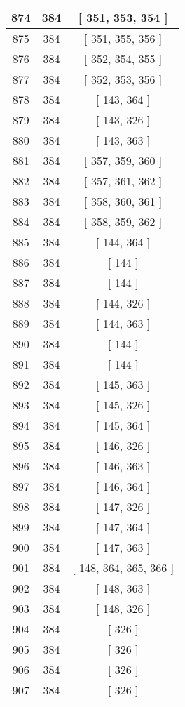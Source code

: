 \begin{center}
\begin{longtable}[H]{|| c c c ||}
\hline
874 & 384 & [ 351, 353, 354 ] \\ 
\hline
875 & 384 & [ 351, 355, 356 ] \\ 
\hline
876 & 384 & [ 352, 354, 355 ] \\ 
\hline
877 & 384 & [ 352, 353, 356 ] \\ 
\hline
878 & 384 & [ 143, 364 ] \\ 
\hline
879 & 384 & [ 143, 326 ] \\ 
\hline
880 & 384 & [ 143, 363 ] \\ 
\hline
881 & 384 & [ 357, 359, 360 ] \\ 
\hline
882 & 384 & [ 357, 361, 362 ] \\ 
\hline
883 & 384 & [ 358, 360, 361 ] \\ 
\hline
884 & 384 & [ 358, 359, 362 ] \\ 
\hline
885 & 384 & [ 144, 364 ] \\ 
\hline
886 & 384 & [ 144 ] \\ 
\hline
887 & 384 & [ 144 ] \\ 
\hline
888 & 384 & [ 144, 326 ] \\ 
\hline
889 & 384 & [ 144, 363 ] \\ 
\hline
890 & 384 & [ 144 ] \\ 
\hline
891 & 384 & [ 144 ] \\ 
\hline
892 & 384 & [ 145, 363 ] \\ 
\hline
893 & 384 & [ 145, 326 ] \\ 
\hline
894 & 384 & [ 145, 364 ] \\ 
\hline
895 & 384 & [ 146, 326 ] \\ 
\hline
896 & 384 & [ 146, 363 ] \\ 
\hline
897 & 384 & [ 146, 364 ] \\ 
\hline
898 & 384 & [ 147, 326 ] \\ 
\hline
899 & 384 & [ 147, 364 ] \\ 
\hline
900 & 384 & [ 147, 363 ] \\ 
\hline
901 & 384 & [ 148, 364, 365, 366 ] \\ 
\hline
902 & 384 & [ 148, 363 ] \\ 
\hline
903 & 384 & [ 148, 326 ] \\ 
\hline
904 & 384 & [ 326 ] \\ 
\hline
905 & 384 & [ 326 ] \\ 
\hline
906 & 384 & [ 326 ] \\ 
\hline
907 & 384 & [ 326 ] \\ 
\hline

\end{longtable}
\end{center}
